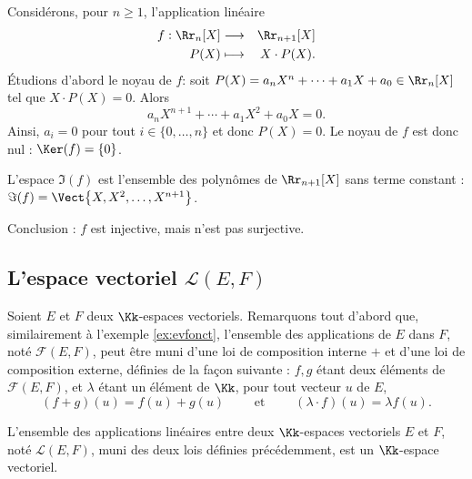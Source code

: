 \documentclass[class=report,crop=false]{standalone}
\begin{document}
\begin{exemple}
Considérons, pour $n\ge1$, l'application linéaire
\begin{eqnarray*}
f : \Rr_n[X] & \longrightarrow & \Rr_{n+1}[X]\\
P(X)  & \longmapsto & X \cdot P(X).
\end{eqnarray*}
\'Etudions d'abord le noyau de $f$: soit $P(X) = a_n X^n + \cdots +a_1 X + a_0 \in \Rr_n[X]$
tel que $X \cdot P(X) = 0$. Alors
$$a_n X^{n+1} + \cdots+ a_1 X^2 + a_0 X = 0.$$
Ainsi, $a_i = 0$ pour tout $i \in \{0,\ldots, n\}$ et donc $P(X) = 0$.
Le noyau de $f$ est donc nul : $\Ker(f) = \{0\}$.

L'espace $\Im(f)$ est l'ensemble des polynômes de $\Rr_{n+1}[X]$
sans terme constant : $\Im(f) = \Vect \big\{X, X^2,\dots, X^{n+1}\big\}$.

Conclusion : $f$ est injective, mais n'est pas surjective.
\end{exemple}


\subsection{L'espace vectoriel $\mathcal{L}(E,F)$}

Soient $E$ et $F$ deux $\Kk$-espaces vectoriels. Remarquons tout d'abord que,
similairement à l'exemple \ref{ex:evfonct},
l'ensemble des applications de $E$ dans $F$, noté $\mathcal{F}(E,F)$,
peut être muni d'une loi de composition interne $+$ et d'une loi de composition externe,
définies de la façon suivante :
$f, g$ étant deux éléments de $\mathcal{F}(E,F)$, et
$\lambda$ étant un élément de $\Kk$, pour tout vecteur $u$ de $E$,
$$(f+g)(u)=f(u)+g(u)\qquad \text{ et } \qquad (\lambda \cdot f)(u)=\lambda f(u).$$

\begin{proposition}
L'ensemble des applications linéaires entre deux $\Kk$-espaces vectoriels $E$ et $F$,
noté $\mathcal{L}(E,F)$, muni des deux lois définies précédemment, est un $\Kk$-espace vectoriel.
\end{proposition}
\end{document}
